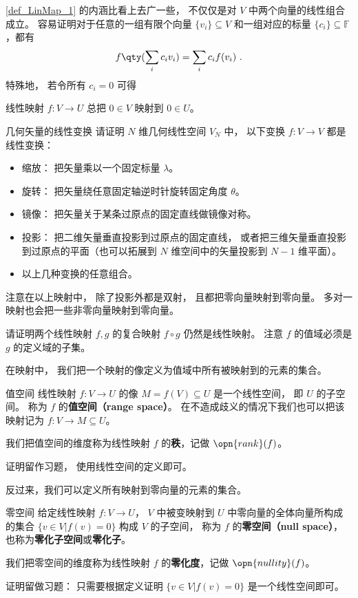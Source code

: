 \autoref{def_LinMap_1} 的内涵比看上去广一些， 不仅仅是对 $V$ 中两个向量的线性组合成立。 容易证明对于任意的一组有限个向量 $\{v_i\}\subseteq V$ 和一组对应的标量 $\{c_i\}\subseteq\mathbb{F}$，都有
\begin{equation}\label{eq_LinMap_1}
f\qty(\sum_i c_i v_i)=\sum_i c_i f(v_i)~.
\end{equation}
特殊地， 若令所有 $c_i = 0$ 可得
\begin{corollary}{}\label{cor_LinMap_1}
线性映射 $f:V\to U$ 总把 $0 \in V$ 映射到 $0 \in U$。
\end{corollary}

\begin{exercise}{几何矢量的线性变换}
请证明 $N$ 维几何线性空间 $V_N$ 中， 以下变换 $f:V\to V$ 都是线性变换：
\begin{itemize}
\item 缩放： 把矢量乘以一个固定标量 $\lambda$。
\item 旋转： 把矢量绕任意固定轴逆时针旋转固定角度 $\theta$。
\item 镜像： 把矢量关于某条过原点的固定直线做镜像对称。
\item 投影： 把二维矢量垂直投影到过原点的固定直线， 或者把三维矢量垂直投影到过原点的平面（也可以拓展到 $N$ 维空间中的矢量投影到 $N-1$ 维平面）。
\item 以上几种变换的任意组合。
\end{itemize}
\end{exercise}
注意在以上映射中， 除了投影外都是双射， 且都把零向量映射到零向量。 多对一映射也会把一些非零向量映射到零向量。

\begin{exercise}{}
请证明两个线性映射 $f, g$ 的复合映射 $f \circ g$ 仍然是线性映射。 注意 $f$ 的值域必须是 $g$ 的定义域的子集。
\end{exercise}

在映射中， 我们把一个映射的像定义为值域中所有被映射到的元素的集合。
\begin{definition}{值空间}\label{def_LinMap_3}
线性映射 $f:V\to U$ 的像 $M = f(V) \subseteq U$ 是一个线性空间， 即 $U$ 的子空间。 称为 $f$ 的\textbf{值空间（range space）}。 在不造成歧义的情况下我们也可以把该映射记为 $f: V\to M \subseteq U$。

我们把值空间的维度称为线性映射 $f$ 的\textbf{秩}，记做 $\opn{rank}(f)$。
\end{definition}
证明留作习题， 使用线性空间的定义即可。

反过来，我们可以定义所有映射到零向量的元素的集合。
\begin{definition}{零空间}\label{def_LinMap_2}
给定线性映射 $f:V\to U$， $V$ 中被变映射到 $U$ 中零向量的全体向量所构成的集合 $\{v\in V|f(v)= 0\}$ 构成 $V$ 的子空间， 称为 $f$ 的\textbf{零空间（null space）}， 也称为\textbf{零化子空间}或\textbf{零化子}。

我们把零空间的维度称为线性映射 $f$ 的\textbf{零化度}，记做 $\opn{nullity}(f)$。
\end{definition}
证明留做习题： 只需要根据定义证明 $\{v\in V|f(v)= 0\}$ 是一个线性空间即可。 

